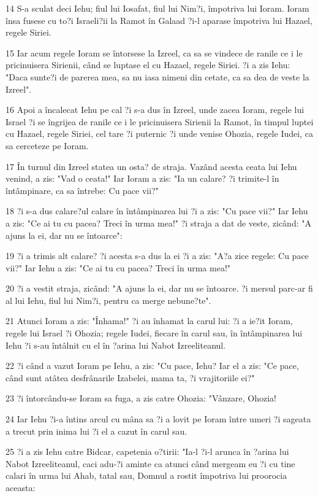 \par 14 S-a sculat deci Iehu; fiul lui Iosafat, fiul lui Nim?i, împotriva lui Ioram. Ioram însa fusese cu to?i Israeli?ii la Ramot în Galaad ?i-l aparase împotriva lui Hazael, regele Siriei.
\par 15 Iar acum regele Ioram se întorsese la Izreel, ca sa se vindece de ranile ce i le pricinuisera Sirienii, când se luptase el cu Hazael, regele Siriei. ?i a zis Iehu: "Daca sunte?i de parerea mea, sa nu iasa nimeni din cetate, ca sa dea de veste la Izreel".
\par 16 Apoi a încalecat Iehu pe cal ?i s-a dus în Izreel, unde zacea Ioram, regele lui Israel ?i se îngrijea de ranile ce i le pricinuisera Sirienii la Ramot, în timpul luptei cu Hazael, regele Siriei, cel tare ?i puternic ?i unde venise Ohozia, regele Iudei, ca sa cerceteze pe Ioram.
\par 17 În turnul din Izreel statea un osta? de straja. Vazând acesta ceata lui Iehu venind, a zis: "Vad o ceata!" Iar Ioram a zis: "Ia un calare? ?i trimite-l în întâmpinare, ca sa întrebe: Cu pace vii?"
\par 18 ?i s-a dus calare?ul calare în întâmpinarea lui ?i a zis: "Cu pace vii?" Iar Iehu a zis: "Ce ai tu cu pacea? Treci în urma mea!" ?i straja a dat de veste, zicând: "A ajuns la ei, dar nu se întoarce":
\par 19 ?i a trimis alt calare? ?i acesta s-a dus la ei ?i a zis: "A?a zice regele: Cu pace vii?" Iar Iehu a zis: "Ce ai tu cu pacea? Treci în urma mea!"
\par 20 ?i a vestit straja, zicând: "A ajuns la ei, dar nu se întoarce. ?i mersul parc-ar fi al lui Iehu, fiul lui Nim?i, pentru ca merge nebune?te".
\par 21 Atunci Ioram a zis: "Înhama!" ?i au înhamat la carul lui: ?i a ie?it Ioram, regele lui Israel ?i Ohozia; regele Iudei, fiecare în carul sau, în întâmpinarea lui Iehu ?i s-au întâlnit cu el în ?arina lui Nabot Izreeliteanul.
\par 22 ?i când a vazut Ioram pe Iehu, a zis: "Cu pace, Iehu? Iar el a zis: "Ce pace, când sunt atâtea desfrânarile Izabelei, mama ta, ?i vrajitoriile ei?"
\par 23 ?i întorcându-se Ioram sa fuga, a zis catre Ohozia: "Vânzare, Ohozia!
\par 24 Iar Iehu ?i-a întins arcul cu mâna sa ?i a lovit pe Ioram între umeri ?i sageata a trecut prin inima lui ?i el a cazut în carul sau.
\par 25 ?i a zis Iehu catre Bidcar, capetenia o?tirii: "Ia-l ?i-l arunca în ?arina lui Nabot Izreeliteanul, caci adu-?i aminte ca atunci când mergeam eu ?i cu tine calari în urma lui Ahab, tatal sau, Domnul a rostit împotriva lui proorocia aceasta:
